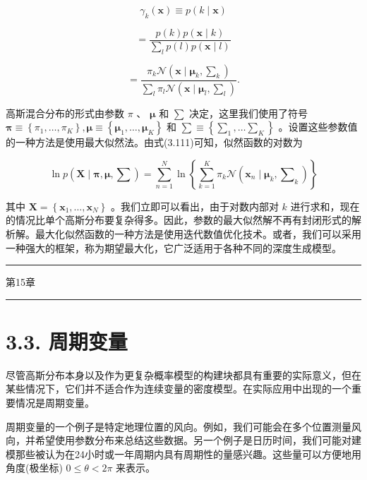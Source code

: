\documentclass[10pt]{report}
\newcommand{\HRule}{\begin{center}\rule{0.9\linewidth}{0.2mm}\end{center}}
\begin{document}
\[
{\gamma }_{k}\left( \mathbf{x}\right)  \equiv  p\left( {k \mid  \mathbf{x}}\right)
\]

\[
= \frac{p\left( k\right) p\left( {\mathbf{x} \mid  k}\right) }{\mathop{\sum }\limits_{l}p\left( l\right) p\left( {\mathbf{x} \mid  l}\right) }
\]

\[
= \frac{{\pi }_{k}\mathcal{N}\left( {\mathbf{x} \mid  {\mathbf{\mu }}_{k},{\mathbf{\sum }}_{k}}\right) }{\mathop{\sum }\limits_{l}{\pi }_{l}\mathcal{N}\left( {\mathbf{x} \mid  {\mathbf{\mu }}_{l},{\mathbf{\sum }}_{l}}\right) }. \tag{3.115}
\]

高斯混合分布的形式由参数 \(\pi\) 、 \(\mathbf{\mu }\) 和 \(\mathbf{\sum }\) 决定，这里我们使用了符号 \(\mathbf{\pi } \equiv  \left\{  {{\pi }_{1},\ldots ,{\pi }_{K}}\right\}  ,\mathbf{\mu } \equiv  \left\{  {{\mathbf{\mu }}_{1},\ldots ,{\mathbf{\mu }}_{K}}\right\}\) 和 \(\mathbf{\sum } \equiv  \left\{  {{\mathbf{\sum }}_{1},\ldots {\mathbf{\sum }}_{K}}\right\}\) 。设置这些参数值的一种方法是使用最大似然法。由式(3.111)可知，似然函数的对数为

\[
\ln p\left( {\mathbf{X} \mid  \mathbf{\pi },\mathbf{\mu },\mathbf{\sum }}\right)  = \mathop{\sum }\limits_{{n = 1}}^{N}\ln \left\{  {\mathop{\sum }\limits_{{k = 1}}^{K}{\pi }_{k}\mathcal{N}\left( {{\mathbf{x}}_{n} \mid  {\mathbf{\mu }}_{k},{\mathbf{\sum }}_{k}}\right) }\right\}   \tag{3.116}
\]

其中 \(\mathbf{X} = \left\{  {{\mathbf{x}}_{1},\ldots ,{\mathbf{x}}_{N}}\right\}\) 。我们立即可以看出，由于对数内部对 \(k\) 进行求和，现在的情况比单个高斯分布要复杂得多。因此，参数的最大似然解不再有封闭形式的解析解。最大化似然函数的一种方法是使用迭代数值优化技术。或者，我们可以采用一种强大的框架，称为期望最大化，它广泛适用于各种不同的深度生成模型。

\HRule

第15章

\HRule

\section*{3.3. 周期变量}

尽管高斯分布本身以及作为更复杂概率模型的构建块都具有重要的实际意义，但在某些情况下，它们并不适合作为连续变量的密度模型。在实际应用中出现的一个重要情况是周期变量。

周期变量的一个例子是特定地理位置的风向。例如，我们可能会在多个位置测量风向，并希望使用参数分布来总结这些数据。另一个例子是日历时间，我们可能对建模那些被认为在24小时或一年周期内具有周期性的量感兴趣。这些量可以方便地用角度(极坐标) \(0 \leq  \theta  < {2\pi }\) 来表示。
\end{document}
